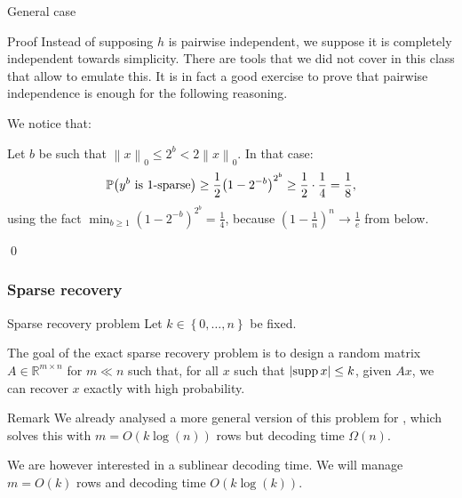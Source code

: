 \documentclass[a4paper]{article}
\begin{document}
\begin{parag}{General case}
    \begin{subparag}{Proof}
        Instead of supposing $h$ is pairwise independent, we suppose it is completely independent towards simplicity. There are tools that we did not cover in this class that allow to emulate this. It is in fact a good exercise to prove that pairwise independence is enough for the following reasoning.

        We notice that:
        
        Let $b$ be such that $\left\|x\right\|_0 \leq 2^b < 2 \left\|x\right\|_0$. In that case: 
        \[\prob\left(y^b \text{ is 1-sparse}\right) \geq \frac{1}{2} \left(1 - 2^{-b}\right)^{2^b} \geq \frac{1}{2}\cdot \frac{1}{4} = \frac{1}{8},\]
        using the fact $\min_{b \geq 1} \left(1 - 2^{-b}\right)^{2^b} = \frac{1}{4}$, because $\left(1 - \frac{1}{n}\right)^n \to \frac{1}{e}$ from below.

        \qed
    \end{subparag}
\end{parag}

\subsubsection{Sparse recovery}

\begin{parag}{Sparse recovery problem}
    Let $k \in \left\{0, \ldots, n\right\}$ be fixed. 

    The goal of the exact sparse recovery problem is to design a random matrix $A \in \mathbb{R}^{m \times n}$ for $m \ll n$ such that, for all $x$ such that $\left|\supp x\right| \leq k$, given $Ax$, we can recover $x$ exactly with high probability.

    \begin{subparag}{Remark}
        We already analysed a more general version of this problem for , which solves this with $m = O\left(k \log\left(n\right)\right)$ rows but decoding time $\Omega\left(n\right)$. 

        We are however interested in a sublinear decoding time. We will manage $m = O\left(k\right)$ rows and decoding time $O\left(k \log\left(k\right)\right)$.
    \end{subparag}
\end{parag}
\end{document}
